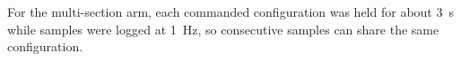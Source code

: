 For the multi-section arm, each commanded configuration was held for about 3~s while samples were logged at 1~Hz, so consecutive samples can share the same configuration.
